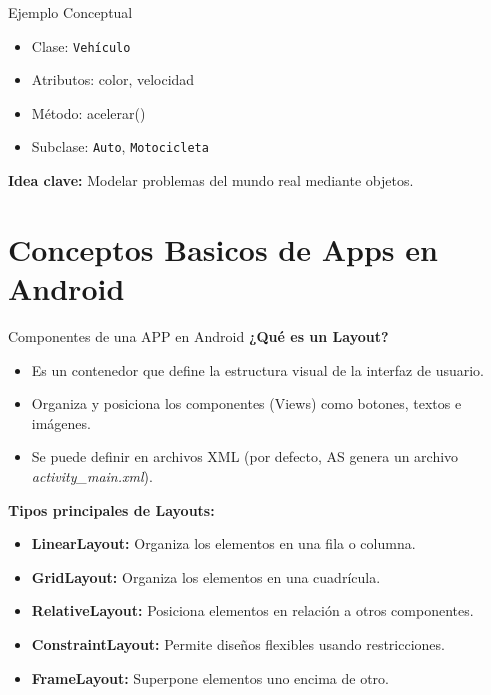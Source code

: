 \documentclass[aspectratio=169,compress]{beamer}
\begin{document}
\begin{frame}{Ejemplo Conceptual}
\begin{itemize}
    \item Clase: \texttt{Vehículo}
    \item Atributos: color, velocidad
    \item Método: acelerar()
    \item Subclase: \texttt{Auto}, \texttt{Motocicleta}
\end{itemize}

\vspace{0.5cm}

\textbf{Idea clave:} Modelar problemas del mundo real mediante objetos.
\end{frame}

\section{Conceptos Basicos de Apps en Android}

\begin{frame}{Componentes de una APP en Android}
\textbf{¿Qué es un Layout?}
\begin{itemize} 
\item Es un contenedor que define la estructura visual de la interfaz de usuario. 
\item Organiza y posiciona los componentes (Views) como botones, textos e imágenes. 
\item Se puede definir en archivos XML (por defecto, AS genera un archivo \textit{activity\_main.xml}). 
\end{itemize}

\vspace{0.5cm} 
\textbf{Tipos principales de Layouts:} 
\begin{itemize} 
\item \textbf{LinearLayout:} Organiza los elementos en una fila o columna. 
\item \textbf{GridLayout:} Organiza los elementos en una cuadrícula. 
\item \textbf{RelativeLayout:} Posiciona elementos en relación a otros componentes. 
\item \textbf{ConstraintLayout:} Permite diseños flexibles usando restricciones. 
\item \textbf{FrameLayout:} Superpone elementos uno encima de otro. 
\end{itemize}
\end{frame}
\end{document}
